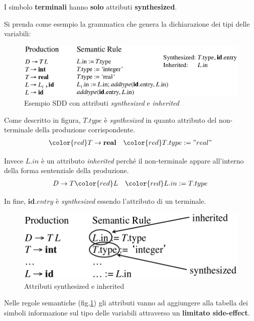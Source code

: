 I simbolo \textbf{terminali} hanno \textbf{solo} attributi \textbf{synthesized}.

Si prenda come esempio la grammatica che genera la dichiarazione dei tipi delle
variabili:
\begin{figure}[H]
  \centering
  \includegraphics[scale=0.45]{res/image/ex_type}
  \caption{Esempio SDD con attributi \textit{synthesized} e \textit{inherited}}
  \label{img:ex_type}
\end{figure}

Come descritto in figura, $T.type$ \`e \textit{synthesized} in quanto attributo
del non-terminale della produzione corrispondente.
\begin{align*}
& {\color{red}T} \to \mathbf{real}  & {\color{red}T}.type:="real"
\end{align*}

Invece $L.in$ \`e un attributo \textit{inherited} perch\'e il non-terminale
appare all'interno della forma sentenziale della produzione.
\begin{align*}
& D \to T\color{red}L & {\color{red}L}.in:=T.type
\end{align*}

In fine, $\mathbf{id}.entry$ \`e \textit{synthesized} essendo l'attributo di un
terminale.

\begin{figure}[H]
  \centering
  \includegraphics[scale=0.4]{res/image/synthesized_inherited}
  \caption{Attributi synthesized e inherited}
  \label{img:synthesized_inherited}
\end{figure}

Nelle regole semantiche (fig.\ref{img:ex_type}) gli attributi vanno ad
aggiungere alla tabella dei simboli informazione sul tipo delle variabili
attraverso un \textbf{limitato side-effect}.

